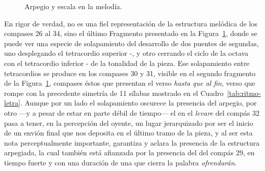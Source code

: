 \begin{figure}[H]
\centering
{}

\vspace{0.5cm}

\caption{Arpegio y escala en la melodía.}
\label{fig:arpegio-escala-cuchi}
\end{figure}

\noindent En rigor de verdad,  no es una fiel representación de la estructura melódica de los compases 26 al 34, sino el último Fragmento presentado en la Figura~\ref{fig:arpegio-escala-cuchi}, donde se puede ver una especie de solapamiento del desarrollo de dos puentes de segundas, uno desplegando el tetracordio superior -, y otro cerrando el ciclo de la octava con el tetracordio inferior - de la tonalidad de la pieza. Ese solapamiento entre tetracordios se produce en los compases 30 y 31, visible en el segundo fragmento de la Figura~\ref{fig:arpegio-escala-cuchi}, compases éstos que presentan el verso \emph{hasta que al fin}, verso que rompe con la precedente simetría de 11 sílabas mostrado en el Cuadro~\ref{tab:ritmo-letra}. Aunque por un lado el solapamiento oscurece la presencia del arpegio, por otro ---y a pesar de estar en parte débil de tiempo--- el  en el \emph{levare} del compás 32 pasa a tener, en la percepción del oyente, un lugar jerarquizado por ser el inicio de un envión final que nos deposita en el último tramo de la pieza, y al ser esta nota perceptualmente importante, garantiza y aclara la presencia de la estructura arpegiada, la cual también está afianzada por la presencia del  del compás 29, en tiempo fuerte y con una duración de una \negrap que cierra la palabra \emph{ofrendarán}.

